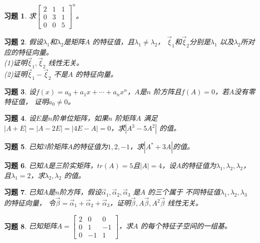 \documentclass[a4paper]{book}
\newtheorem{ex}{习题}[chapter]
\begin{document}
\begin{ex}\label{7.5}
求$\begin{bmatrix}2&1&1\\0&3&1\\0&0&5\end{bmatrix}^{n}$。
\end{ex}

\begin{ex}\label{7.6}
假设$\lambda_1$和$\lambda_2$是矩阵$A$ 的特征值，且$\lambda_1\neq\lambda_2$，
$\vec{\xi}_1$和$\vec{\xi}_2$分别是$\lambda_1$ 以及$\lambda_2$所对应的特征向量。\\
(1)证明$\vec{\xi}_1,\vec{\xi}_2$ 线性无关。\\
(2)证明$\vec{\xi}_1-\vec{\xi}_2$ 不是$A$ 的特征向量。
\end{ex}

\begin{ex}\label{7.7}
设$f(x)=a_0+a_1x+\cdots+a_nx^n$，$A$是$n$ 阶方阵且$f(A)=0$，若$A$没有零特征值，
证明$a_0\neq0$。
\end{ex}

\begin{ex}\label{7.8}
设$E$是$n$阶单位矩阵，如果$n$ 阶矩阵$A$ 满足$|A+E|=|A-2E|=|4E-A|=0$，求$|A^3-5A^2|$ 的值。
\end{ex}

\begin{ex}\label{7.9}
已知3阶矩阵$A$的特征值为$1,2,-1$，求$|A^*+3A|$的值。
\end{ex}

\begin{ex}\label{7.10}
已知$A$是三阶实矩阵，$tr(A)=5$且$|A|=4$，设$A$的特征值为$\lambda_1,\lambda_2,\lambda_2$，
且$\lambda_1=2$，求$\lambda_2,\lambda_2$ 的值。
\end{ex}

\begin{ex}\label{7.11}
已知$A$是$n$阶方阵，假设$\vec{\alpha}_1,\vec{\alpha}_2,\vec{\alpha}_3$ 是$A$ 的三个属于
不同特征值$\lambda_1,\lambda_2,\lambda_3$ 的特征向量，
令$\vec{\beta}=\vec{\alpha}_1+\vec{\alpha}_2+\vec{\alpha}_3$，证明$\vec{\beta},A\vec{\beta},A^2\vec{\beta}$ 线性无关。
\end{ex}

\begin{ex}\label{7.12}
已知矩阵$A=\begin{bmatrix}2&0&0\\0&1&-1\\0&-1&1\end{bmatrix}$，求$A$ 的每个特征子空间的一组基。
\end{ex}
\end{document}
